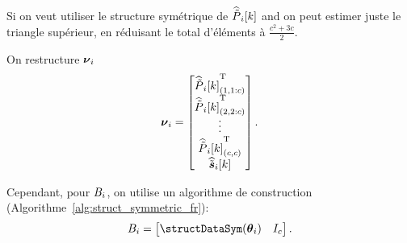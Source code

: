 \documentclass[../main.tex]{subfiles}
\begin{document}
Si on veut utiliser le structure symétrique de $\widehat{\tilde{P}}_{i}[k]$ and on peut estimer juste le triangle supérieur, en réduisant le total d'éléments à ${\frac{c^{2}+3c}{2}}$.


On restructure ${\boldsymbol{\nu}_{i}}$
\begin{equation}
  \rlsparam=\left[
    \begin{matrix}
      \elem[1,1:c]{\Plintildeestimate}\T\\
      \elem[2,2:c]{\Plintildeestimate}\T\\
      \vdots\\
      \elem[c,c]{\Plintildeestimate}\T\\
      \siktildeestimate\\
    \end{matrix}
  \right].
\end{equation}

Cependant, pour ${B_i}$, on utilise un algorithme de construction (Algorithme~\ref{alg:struct_symmetric_fr}):
\begin{equation}
  \rlssysinput=\left[
    \begin{matrix}
      \text{\structDataSym}(\thetai) &  I_{c}
    \end{matrix}
  \right].
\end{equation}
\end{document}
